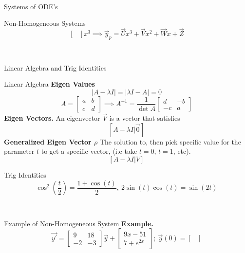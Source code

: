 \documentclass{article}
\begin{document}
\begin{multicols*}{3}
\begin{blackbox}{Systems of ODE's}
{\begin{bluebox}{Non-Homogeneous Systems}
\[\begin{bmatrix}
        \end{bmatrix}x^3 \implies \vec{y}_p = \vec{U}x^3 + \vec{V}x^2 + \vec{W}x + \vec{Z} \]
    \end{bluebox}\\[-2ex]
    }
\end{blackbox}
\begin{blackbox}{Linear Algebra and Trig Identities}
    {\footnotesize
    \begin{pinkbox}{Linear Algebra}      
        \textbf{Eigen Values}\\[-3ex]
        \[|A - \lambda I| = |\lambda I - A| = 0\]
        \[A = \begin{bmatrix}
            a & b\\
            c & d
        \end{bmatrix} \implies A^{-1} = \frac{1}{\det A}\begin{bmatrix}
            d & -b\\
            -c & a
        \end{bmatrix}\]
        \textbf{Eigen Vectors.} An eigenvector $\vec{V}$ is a vector that satisfies\\[-5ex]
        \[[A - \lambda I | \vec{0}]\]
        \textbf{Generalized Eigen Vector $\rho$} The solution to, then pick specific value for the parameter $t$ to get a specific vector, (i.e take $t=0$, $t=1$, etc).\\[-2ex]
        \[[A - \lambda I | V]\]
    \end{pinkbox}
    \begin{redbox}{Trig Identities}
        \vspace{-2ex}
        \[\cos^2\left(\frac{t}{2}\right) = \frac{1+\cos(t)}{2}, \  2\sin(t)\cos(t) = \sin(2t)\]
        \vspace{-3ex}
    \end{redbox}\\[-3ex]
    }
\end{blackbox}
\begin{blackbox}{Example of Non-Homogeneous System}
    {\footnotesize
        \textbf{Example.}\\[-2ex] 
        \[\vec{y'} = \begin{bmatrix}
            9 & 18\\
            -2 & -3
        \end{bmatrix}\vec{y} + \begin{bmatrix}
            9x - 51\\
            7 + e^{2x}
        \end{bmatrix}; \ \vec{y}(0) = \begin{bmatrix}

\end{bmatrix}\]}
\end{blackbox}
\end{multicols*}
\end{document}
